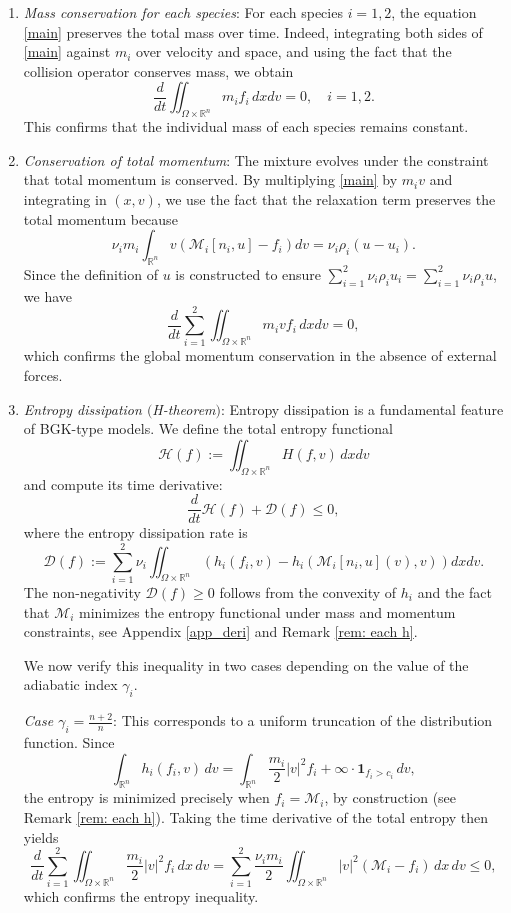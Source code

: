 \documentclass[10pt,reqno]{amsart}
\numberwithin{equation}{section}
\newcommand{\R}{\mathbb R}
\newcommand{\bq}{\begin{equation}}
\newcommand{\eq}{\end{equation}}
\begin{document}
\begin{enumerate}[label=(\roman*)]
	\item \emph{Mass conservation for each species}: For each species $i = 1,2$, the equation \eqref{main} preserves the total mass over time. Indeed, integrating both sides of \eqref{main} against $m_i$ over velocity and space, and using the fact that the collision operator conserves mass, we obtain
	\[
	\frac{d}{dt} \iint_{\Omega \times \mathbb{R}^n} m_i f_i \,dx dv = 0,\quad i=1,2.
	\]
	This confirms that the individual mass of each species remains constant.

	\item \emph{Conservation of total momentum}: The mixture evolves under the constraint that total momentum is conserved. By multiplying \eqref{main} by $m_i v$ and integrating in $(x,v)$, we use the fact that the relaxation term preserves the total momentum because
	\[
\nu_i m_i  \int_{\mathbb{R}^n} v 	\left( \mathcal{M}_i[n_i, u] - f_i \right) dv =  \nu_i\rho_i (u - u_i).
	\]
	Since the definition of $u$ is constructed to ensure $\sum_{i=1}^2 \nu_i \rho_i u_i = \sum_{i=1}^2 \nu_i \rho_i u$, we have
	\[
	\frac{d}{dt} \sum_{i=1}^2 \iint_{\Omega \times \mathbb{R}^n} m_i v f_i \,dx dv = 0,
	\]
	which confirms the global momentum conservation in the absence of external forces.

	\item \emph{Entropy dissipation $(${\rm H}-theorem$)$}: Entropy dissipation is a fundamental feature of BGK-type models. We define the total entropy functional
	\[
	\mathcal{H}(f) := \iint_{\Omega \times \mathbb{R}^n} H(f,v)\,dxdv
	\]
	and compute its time derivative:
	\[
	\frac{d}{dt} \mathcal{H}(f) + \mathcal{D}(f) \leq 0,
	\]
	where the entropy dissipation rate is
	\[
	\mathcal{D}(f) := \sum_{i=1}^2 \nu_i  \iint_{\Omega \times \mathbb{R}^n} \left( h_i(f_i,v) - h_i(\mathcal{M}_i[n_i, u](v), v) \right)dxdv.
	\]
	The non-negativity $\mathcal{D}(f) \geq 0$ follows from the convexity of $h_i$ and the fact that $\mathcal{M}_i$ minimizes the entropy functional under mass and momentum constraints, see Appendix \ref{app_deri} and Remark \ref{rem: each h}.

	We now verify this inequality in two cases depending on the value of the adiabatic index $\gamma_i$.

\emph{Case $\gamma_i = \frac{n+2}{n}$}: This corresponds to a uniform truncation of the distribution function. Since 
	\[
	\int_{\R^n} h_i(f_i,v)\,dv = \int_{\R^n}\frac{m_i}{2}|v|^2 f_i + \infty \cdot \mathbf{1}_{f_i > c_i}\,dv, 
	\]
	the entropy is minimized precisely when $f_i = \mathcal{M}_i$, by construction (see Remark \ref{rem: each h}). Taking the time derivative of the total entropy then yields
\bq\label{end point}
	\frac{d}{dt} \sum_{i=1}^2 \iint_{\Omega \times \mathbb{R}^n} \frac{m_i}{2} |v|^2 f_i \,dx\,dv = \sum_{i=1}^2 \frac{\nu_i m_i}{2} \iint_{\Omega \times \mathbb{R}^n} |v|^2 (\mathcal{M}_i - f_i)\,dx\,dv \leq 0,
\eq
which confirms the entropy inequality.


\end{enumerate}
\end{document}
